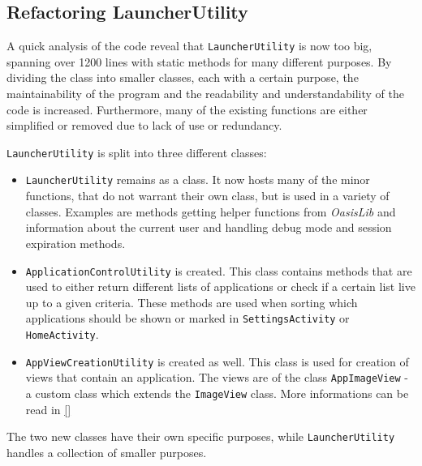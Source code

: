 \subsection{Refactoring LauncherUtility}\label{sect:sprint4:refactoring}

A quick analysis of the code reveal that \lstinline|LauncherUtility| is now too big, spanning over 1200 lines with static methods for many different purposes.
By dividing the class into smaller classes, each with a certain purpose, the maintainability of the program and the readability and understandability of the code is increased.
Furthermore, many of the existing functions are either simplified or removed due to lack of use or redundancy.

\lstinline|LauncherUtility| is split into three different classes:

\begin{itemize}
\item \lstinline|LauncherUtility| remains as a class.
It now hosts many of the minor functions, that do not warrant their own class, but is used in a variety of classes.
Examples are methods getting helper functions from \textit{OasisLib} and  information about the current user and handling debug mode and session expiration methods.
\item \lstinline|ApplicationControlUtility| is created.
This class contains methods that are used to either return different lists of applications or check if a certain list live up to a given criteria.
These methods are used when sorting which applications should be shown or marked in \lstinline|SettingsActivity| or \lstinline|HomeActivity|.
\item \lstinline|AppViewCreationUtility| is created as well.
This class is used for creation of views that contain an application.
The views are of the class \lstinline|AppImageView| - a custom class which extends the \lstinline|ImageView| class.
More informations can be read in \cref{}
\end{itemize}

The two new classes have their own specific purposes, while \lstinline|LauncherUtility| handles a collection of smaller purposes.